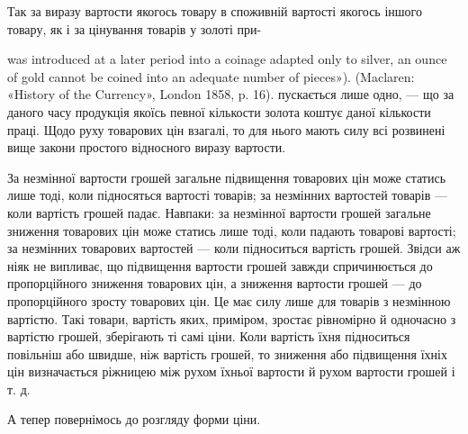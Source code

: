 Так за виразу вартости якогось товару в споживній вартості
якогось іншого товару, як і за цінування товарів у золоті при-

was introduced at a later period into a coinage adapted only to silver, an
ounce of gold cannot be coined into an adequate number of pieces»). (Maclaren:
«History of the Currency», London 1858, p. 16).
пускається лише одно, — що за даного часу продукція якоїсь певної
кількости золота коштує даної кількости праці. Щодо руху
товарових цін взагалі, то для нього мають силу всі розвинені
вище закони простого відносного виразу вартости.

За незмінної вартости грошей загальне підвищення товарових
цін може статись лише тоді, коли підносяться вартості товарів;
за незмінних вартостей товарів — коли вартість грошей
падає. Навпаки: за незмінної вартости грошей загальне зниження
товарових цін може статись лише тоді, коли падають
товарові вартості; за незмінних товарових вартостей — коли
підноситься вартість грошей. Звідси аж ніяк не випливає, що
підвищення вартости грошей завжди спричинюється до пропорційного
зниження товарових цін, а зниження вартости грошей —
до пропорційного зросту товарових цін. Це має силу лише для
товарів з незмінною вартістю. Такі товари, вартість яких, приміром,
зростає рівномірно й одночасно з вартістю грошей, зберігають
ті самі ціни. Коли вартість їхня підноситься повільніш
або швидше, ніж вартість грошей, то зниження або підвищення
їхніх цін визначається ріжницею між рухом їхньої вартости й
рухом вартости грошей і т. д.

А тепер повернімось до розгляду форми ціни.

